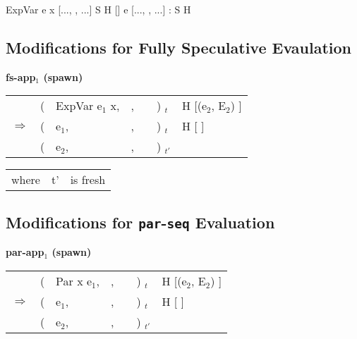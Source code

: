\documentclass{llncs}
\begin{document}
	{ExpVar e x}	{[..., \px, ...]}	{S}		{H [\px \bind {}]}
	{e}		{[..., \px, ...]}	{\px : S} 	{H}
\medskip


\subsection{Modifications for Fully Speculative Evaulation}

\noindent \textbf {fs-app$_1$ (spawn)}
\par
\medskip
\noindent
\begin{tabular} {p{ 5mm} p{ 2mm} p{20mm} p{25mm} p{15mm} p{ 8mm} p{37mm}}
	& (
	& ExpVar e$_1$ x,
	& \raggedleft{[..., \px, ...]},
	& \raggedleft{S}
	& ) $_t$
	& H [\px \bind (e$_2$, E$_2$) ]
	\\
	$\Rightarrow$
	& (
	& e$_1$,
	& \raggedleft{[..., \px, ...]},
	& \raggedleft{\px : S}
	& ) $_t$
	& H [\px \bind \blockedon{[ ]} ]
	\\
	& (
	& e$_2$,
	& \raggedleft{E$_2$},
	& \raggedleft{[ \#{}\px ]}
	& ) $_{t'}$
	\\
\end{tabular}
\smallskip

\begin{tabular}{p{10mm}ll}
where	& t'	& is fresh
\end{tabular}
\medskip

\subsection{Modifications for \texttt{par}-\texttt{seq} Evaluation}

\noindent \textbf {par-app$_1$ (spawn)}
\par
\medskip
\noindent
\begin{tabular} {p{ 5mm} p{ 2mm} p{20mm} p{25mm} p{15mm} p{ 8mm} p{37mm}}
	& (
	& Par x e$_1$,
	& \raggedleft{[..., \px, ...]},
	& \raggedleft{S}
	& ) $_t$
	& H [\px \bind (e$_2$, E$_2$) ]
	\\
	$\Rightarrow$
	& (
	& e$_1$,
	& \raggedleft{[..., \px, ...]},
	& \raggedleft{\px : S}
	& ) $_t$
	& H [\px \bind \blockedon{[ ]} ]
	\\
	& (
	& e$_2$,
	& \raggedleft{E$_2$},
	& \raggedleft{[ \#{}\px ]}
	& ) $_{t'}$
	\\
\end{tabular}
\smallskip
\end{document}
